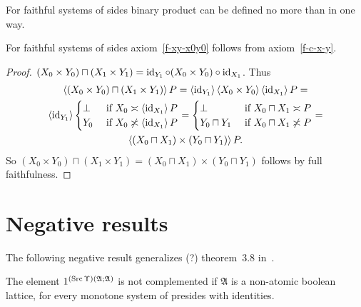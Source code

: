 \begin{cor}
For faithful systems of sides binary product can be defined no more than in one way.
\end{cor}

\begin{prop}
For faithful systems of sides axiom~\ref{f-xy-x0y0} follows from axiom~\ref{f-c-x-y}.
\end{prop}

\begin{proof}
$(X_0\times Y_0)\sqcap(X_1\times Y_1) = \operatorname{id}_{Y_1}\circ(X_0\times Y_0)\circ\operatorname{id}_{X_1}$.
Thus
\begin{multline*}
\left\langle (X_0\times Y_0)\sqcap(X_1\times Y_1)\right\rangle P = \left\langle \operatorname{id}_{Y_1}\right\rangle\left\langle X_0\times Y_0\right\rangle\left\langle \operatorname{id}_{X_1}\right\rangle P = \\
\left\langle \operatorname{id}_{Y_1}\right\rangle\begin{cases}\bot&\text{ if }X_0\asymp\left\langle \operatorname{id}_{X_1}\right\rangle P\\Y_0&\text{ if }X_0\not\asymp\left\langle \operatorname{id}_{X_1}\right\rangle P\end{cases} =
\begin{cases}\bot&\text{ if }X_0\sqcap X_1\asymp P\\Y_0\sqcap Y_1&\text{ if }X_0\sqcap X_1\not\asymp P\end{cases} = \\
\left\langle (X_0\sqcap X_1)\times(Y_0\sqcap Y_1)\right\rangle P.
\end{multline*}
So $(X_0\times Y_0)\sqcap(X_1\times Y_1) = (X_0\sqcap X_1)\times(Y_0\sqcap Y_1)$ follows by full faithfulness.
\end{proof}



\section{Negative results}

The following negative result generalizes (?) theorem~3.8 in~\cite{tprod-dist-lat}.

\begin{thm}\label{neg-prod}
  The element $1^{(\operatorname{Src}\Upsilon)(\mathfrak{A}; \mathfrak{A})}$ is not
  complemented if $\mathfrak{A}$ is a non-atomic boolean lattice,
  for every monotone system of presides with identities.
\end{thm}

